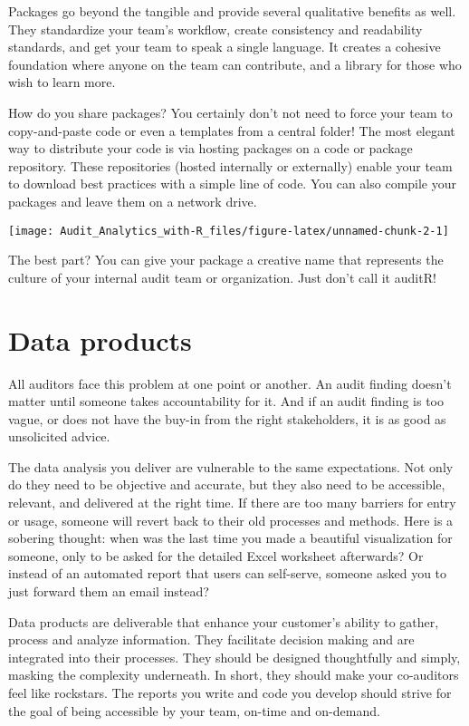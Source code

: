 \documentclass[
]{book}
\begin{document}
Packages go beyond the tangible and provide several qualitative benefits as well. They standardize your team's workflow, create consistency and readability standards, and get your team to speak a single language. It creates a cohesive foundation where anyone on the team can contribute, and a library for those who wish to learn more.

How do you share packages? You certainly don't not need to force your team to copy-and-paste code or even a templates from a central folder! The most elegant way to distribute your code is via hosting packages on a code or package repository. These repositories (hosted internally or externally) enable your team to download best practices with a simple line of code. You can also compile your packages and leave them on a network drive.

\texttt{[image: Audit\_Analytics\_with-R\_files/figure-latex/unnamed-chunk-2-1]}

The best part? You can give your package a creative name that represents the culture of your internal audit team or organization. Just don't call it auditR!

\hypertarget{data-products}{%
\section{Data products}\label{data-products}}

All auditors face this problem at one point or another. An audit finding doesn't matter until someone takes accountability for it. And if an audit finding is too vague, or does not have the buy-in from the right stakeholders, it is as good as unsolicited advice.

The data analysis you deliver are vulnerable to the same expectations. Not only do they need to be objective and accurate, but they also need to be accessible, relevant, and delivered at the right time. If there are too many barriers for entry or usage, someone will revert back to their old processes and methods. Here is a sobering thought: when was the last time you made a beautiful visualization for someone, only to be asked for the detailed Excel worksheet afterwards? Or instead of an automated report that users can self-serve, someone asked you to just forward them an email instead?

Data products are deliverable that enhance your customer's ability to gather, process and analyze information. They facilitate decision making and are integrated into their processes. They should be designed thoughtfully and simply, masking the complexity underneath. In short, they should make your co-auditors feel like rockstars. The reports you write and code you develop should strive for the goal of being accessible by your team, on-time and on-demand.
\end{document}
